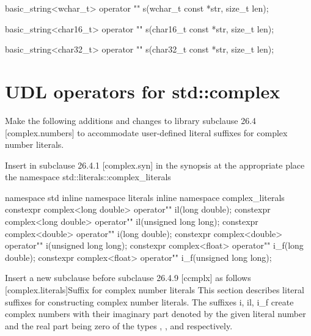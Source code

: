\documentclass[ebook,11pt,article]{memoir}
\begin{document}
\begin{itemdescr}
\pnum
\returns
{}
\end{itemdescr}

\begin{itemdecl}
basic_string<wchar_t> operator "" s(wchar_t const *str, size_t len);
\end{itemdecl}
\begin{itemdescr}
\pnum
\returns
{}
\end{itemdescr}

\begin{itemdecl}
basic_string<char16_t> operator "" s(char16_t const *str, size_t len);
\end{itemdecl}
\begin{itemdescr}
\pnum
\returns
{}
\end{itemdescr}

\begin{itemdecl}
basic_string<char32_t> operator "" s(char32_t const *str, size_t len);
\end{itemdecl}
\begin{itemdescr}
\pnum
\returns
{}
\end{itemdescr}

\section{UDL operators for std::complex}
Make the following additions and changes to library subclause 26.4 [complex.numbers] to accommodate user-defined literal suffixes for complex number literals.

Insert in subclause 26.4.1 [complex.syn] in the synopsis at the appropriate place the namespace std::literals::complex_literals
\begin{codeblock}
namespace std{
inline namespace literals{
inline namespace complex_literals{
constexpr complex<long double> operator"" il(long double);
constexpr complex<long double> operator"" il(unsigned long long);
constexpr complex<double> operator"" i(long double);
constexpr complex<double> operator"" i(unsigned long long);
constexpr complex<float> operator"" i_f(long double);
constexpr complex<float> operator"" i_f(unsigned long long);
}}}
\end{codeblock}

Insert a new subclause before subclause 26.4.9 [ccmplx] as follows
[complex.literals]{Suffix for complex number literals}
\pnum
This section describes literal suffixes for constructing complex number literals. The suffixes i, il, i_f create complex numbers with their imaginary part denoted by the given literal number and the real part being zero of the types , , and  respectively. 
\end{document}
